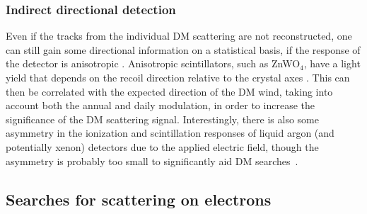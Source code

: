 \subsubsection*{Indirect directional detection} 
Even if the tracks from the individual DM scattering are not reconstructed, one can still gain some directional information on a statistical basis, if the response of the detector is anisotropic \cite{AnisotropicScint,2212.04505,Columnar:Recombination}. Anisotropic scintillators, such as ZnWO${}_4$, have a light yield that depends on the recoil direction relative to the crystal axes \cite{AnisotropicScint}. This can then be correlated with the expected direction of the DM wind, taking into account both the annual and daily modulation, in order to increase the significance of the DM scattering signal. Interestingly, there is also some asymmetry in the ionization and scintillation responses of liquid argon (and potentially xenon) detectors due to the applied electric field, though the asymmetry is probably too small to significantly aid DM searches~\cite{Columnar:Recombination}. 



\subsection{Searches for scattering on electrons}
\label{sec:electron:DMscatter}

